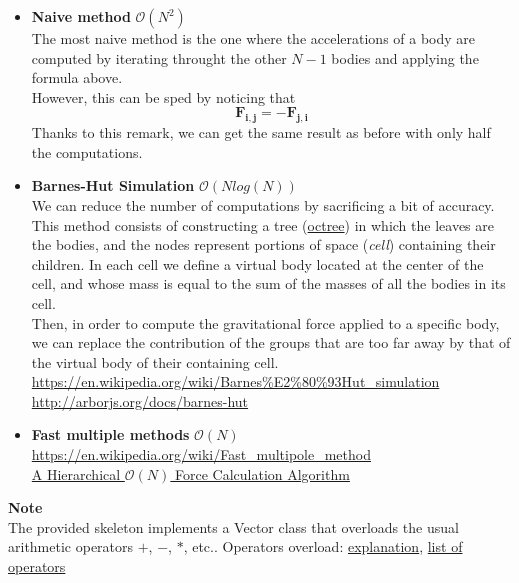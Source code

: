 \documentclass{article}
\newcommand{\myvec}[1]{\ensuremath{\mathbf{#1}}}
\begin{document}
\begin{itemize}
    \item \textbf{Naive method} $\mathcal{O}(N^2)$ \\
    The most naive method is the one where the accelerations of a body are computed by iterating throught the other $N-1$ bodies and applying the formula above.\\
    However, this can be sped by noticing that
    \begin{equation*}
    \myvec{F_{i,j}} = - \myvec{F_{j,i}}
    \end{equation*}
    Thanks to this remark, we can get the same result as before with only half the computations.

    \item \textbf{Barnes-Hut Simulation} $\mathcal{O}(N log(N))$ \\
    We can reduce the number of computations by sacrificing a bit of accuracy. This method consists of constructing a tree (\href{https://en.wikipedia.org/wiki/Octree}{octree}) in which the leaves are the bodies, and the nodes represent portions of space (\emph{cell}) containing their children. In each cell we define a virtual body located at the center of the cell, and whose mass is equal to the sum of the masses of all the bodies in its cell.\\
    Then, in order to compute the gravitational force applied to a specific body, we can replace the contribution of the groups that are too far away by that of the virtual body of their containing cell. \\
    \url{https://en.wikipedia.org/wiki/Barnes\%E2\%80\%93Hut_simulation}\\
    \url{http://arborjs.org/docs/barnes-hut}

    \item \textbf{Fast multiple methods} $\mathcal{O}(N)$ \\
    \url{https://en.wikipedia.org/wiki/Fast_multipole_method}\\
    \href{https://arxiv.org/pdf/astro-ph/0202512.pdf}{A Hierarchical $\mathcal{O}(N)$ Force Calculation Algorithm}
\end{itemize}

\vspace{1em}

\noindent\textbf{Note} \\
The provided skeleton implements a Vector class that overloads the usual arithmetic operators $+$, $-$, $*$, etc.. 
Operators overload: \href{https://www.educative.io/edpresso/how-to-overload-an-operator-in-python}{explanation}, \href{https://docs.python.org/fr/3/library/operator.html}{list of operators}
\end{document}
